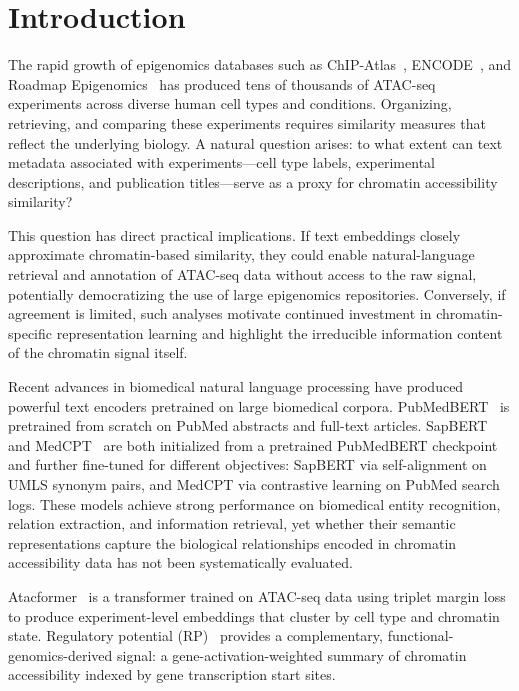 \documentclass[conference]{IEEEtran}
\begin{document}
\section{Introduction}

The rapid growth of epigenomics databases such as ChIP-Atlas~\cite{chipatlas},
ENCODE~\cite{encode}, and Roadmap Epigenomics~\cite{roadmap} has produced tens
of thousands of ATAC-seq experiments across diverse human cell types and
conditions. Organizing, retrieving, and comparing these experiments requires
similarity measures that reflect the underlying biology. A natural question
arises: to what extent can text metadata associated with experiments---cell
type labels, experimental descriptions, and publication titles---serve as a
proxy for chromatin accessibility similarity?

This question has direct practical implications. If text embeddings closely
approximate chromatin-based similarity, they could enable natural-language
retrieval and annotation of ATAC-seq data without access to the raw signal,
potentially democratizing the use of large epigenomics repositories.
Conversely, if agreement is limited, such analyses motivate continued
investment in chromatin-specific representation learning and highlight the
irreducible information content of the chromatin signal itself.

Recent advances in biomedical natural language processing have produced
powerful text encoders pretrained on large biomedical corpora.
PubMedBERT~\cite{pubmedbert} is pretrained from scratch on PubMed abstracts
and full-text articles. SapBERT~\cite{sapbert} and MedCPT~\cite{medcpt} are
both initialized from a pretrained PubMedBERT checkpoint and further
fine-tuned for different objectives: SapBERT via self-alignment on UMLS
synonym pairs, and MedCPT via contrastive learning on PubMed search logs.
These models achieve strong performance on biomedical entity recognition,
relation extraction, and information retrieval, yet whether their semantic
representations capture the biological relationships encoded in chromatin
accessibility data has not been systematically evaluated.

Atacformer~\cite{atacformer} is a transformer trained on ATAC-seq data using
triplet margin loss to produce experiment-level embeddings that cluster by cell
type and chromatin state. Regulatory potential (RP)~\cite{lisa2} provides a
complementary, functional-genomics-derived signal: a gene-activation-weighted
summary of chromatin accessibility indexed by gene transcription start sites.
\end{document}
